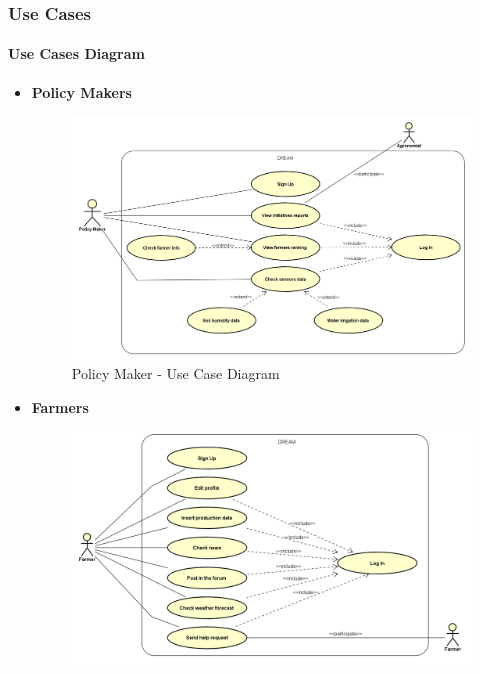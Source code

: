 \documentclass[table, 12pt]{article}
\begin{document}
\subsubsection{Use Cases}
\setcounter{secnumdepth}{4}

\paragraph{Use Cases Diagram}
\begin{itemize}
    \item \textbf {Policy Makers}
    \begin{center}
        \begin{figure}[H]
            \includegraphics[scale=0.55, center]{assets/Use cases/UseCase_PolicyMaker.png}
            \caption{Policy Maker - Use Case Diagram}
            \label{fig: UseCase_PolicyMaker}
        \end{figure}
    \end{center}
    \newpage
    \item \textbf {Farmers}
    \begin{center}
        \begin{figure}[H]
            \includegraphics[scale=0.60, center]{assets/Use cases/UseCase_Farmer.png}

\end{figure}
\end{center}
\end{itemize}
\end{document}
